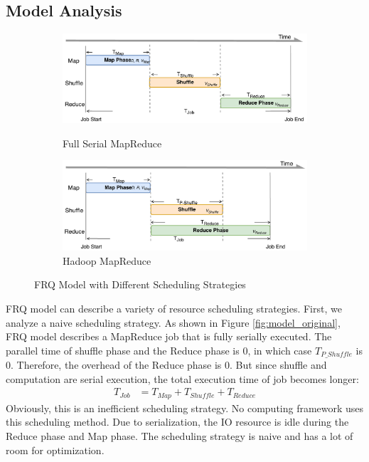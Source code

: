 {\subsection{Model Analysis}\label{model_analysis}

\begin{figure}
	\centering
	\begin{minipage}[hb]{\linewidth}
		\begin{subfigure}{\linewidth}
			\begin{minipage}{\linewidth}
				\includegraphics[width=\linewidth]{fig/model_original}
				\caption{\color{blue}Full Serial MapReduce}
				\label{fig:model_original}
			\end{minipage}
			\begin{minipage}{\linewidth}
				\includegraphics[width=\linewidth]{fig/model_hadoop}
				\caption{\color{blue}Hadoop MapReduce}
				\label{fig:model_hadoop}
			\end{minipage}
		\end{subfigure}
		\caption{\color{blue}FRQ Model with Different Scheduling Strategies}
		\label{fig:model_strategies}
	\end{minipage}
\end{figure}

FRQ model can describe a variety of resource scheduling strategies. First, we analyze a naive scheduling strategy. As shown in Figure \ref{fig:model_original}, FRQ model describes a MapReduce job that is fully serially executed. The parallel time of shuffle phase and the Reduce phase is \(0\), in which case \(T_{P\_Shuffle}\) is \(0\). Therefore, the overhead of the Reduce phase is 0. But since shuffle and computation are serial execution, the total execution time of job becomes longer:
\begin{equation}
\label{equation_Tjob2}
\begin{aligned}
    T_{Job} &= T_{Map} + T_{Shuffle} + T_{Reduce}
\end{aligned}
\end{equation}
Obviously, this is an inefficient scheduling strategy. No computing framework uses this scheduling method. Due to serialization, the IO resource is idle during the Reduce phase and Map phase. The scheduling strategy is naive and has a lot of room for optimization.

}
